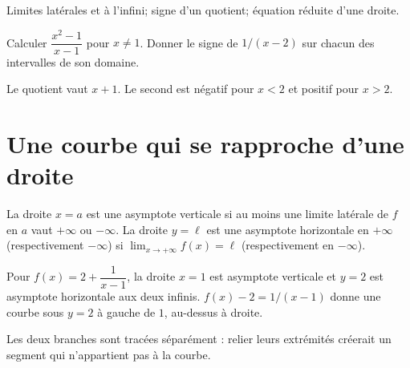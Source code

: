 \label{t11s-c03}
\begin{revision}Limites latérales et à l’infini; signe d’un quotient; équation réduite d’une droite.\end{revision}
\begin{automatismes}\exo\label{t11s-c03-auto}Calculer $\dfrac{x^2-1}{x-1}$ pour $x\ne1$. Donner le signe de $1/(x-2)$ sur chacun des intervalles de son domaine.\end{automatismes}
\begin{corrige}\label{sol-t11s-c03-auto}Le quotient vaut $x+1$. Le second est négatif pour $x<2$ et positif pour $x>2$.\end{corrige}

\section{Une courbe qui se rapproche d’une droite}
\begin{definition}
La droite $x=a$ est une asymptote verticale si au moins une limite latérale de $f$ en $a$ vaut $+\infty$ ou $-\infty$. La droite $y=\ell$ est une asymptote horizontale en $+\infty$ (respectivement $-\infty$) si $\lim_{x\to+\infty}f(x)=\ell$ (respectivement en $-\infty$).
\end{definition}
\begin{exemple}Pour $f(x)=2+\dfrac1{x-1}$, la droite $x=1$ est asymptote verticale et $y=2$ est asymptote horizontale aux deux infinis. $f(x)-2=1/(x-1)$ donne une courbe sous $y=2$ à gauche de $1$, au-dessus à droite.\end{exemple}
\begin{visualisation}
\begin{center}\end{center}
Les deux branches sont tracées séparément : relier leurs extrémités créerait un segment qui n’appartient pas à la courbe.
\end{visualisation}
